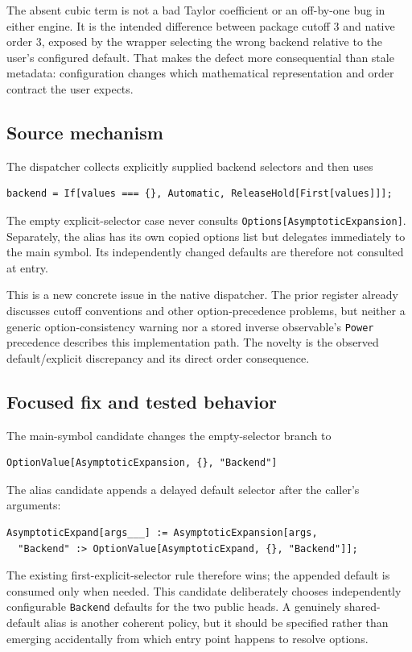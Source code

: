 \documentclass[11pt]{article}
\newcommand{\code}[1]{\texttt{#1}}
\begin{document}
The absent cubic term is not a bad Taylor coefficient or an off-by-one bug in either engine. It is the intended difference between package cutoff $3$ and native order $3$, exposed by the wrapper selecting the wrong backend relative to the user's configured default. That makes the defect more consequential than stale metadata: configuration changes which mathematical representation and order contract the user expects.

\subsection{Source mechanism}
The dispatcher collects explicitly supplied backend selectors and then uses
\begin{lstlisting}
backend = If[values === {}, Automatic, ReleaseHold[First[values]]];
\end{lstlisting}
The empty explicit-selector case never consults \code{Options[AsymptoticExpansion]}. Separately, the alias has its own copied options list but delegates immediately to the main symbol. Its independently changed defaults are therefore not consulted at entry.\cite{bridge}

This is a new concrete issue in the native dispatcher. The prior register already discusses cutoff conventions and other option-precedence problems, but neither a generic option-consistency warning nor a stored inverse observable's \code{Power} precedence describes this implementation path. The novelty is the observed default/explicit discrepancy and its direct order consequence.

\subsection{Focused fix and tested behavior}
The main-symbol candidate changes the empty-selector branch to
\begin{lstlisting}
OptionValue[AsymptoticExpansion, {}, "Backend"]
\end{lstlisting}
The alias candidate appends a delayed default selector after the caller's arguments:
\begin{lstlisting}
AsymptoticExpand[args___] := AsymptoticExpansion[args,
  "Backend" :> OptionValue[AsymptoticExpand, {}, "Backend"]];
\end{lstlisting}
The existing first-explicit-selector rule therefore wins; the appended default is consumed only when needed. This candidate deliberately chooses independently configurable \code{Backend} defaults for the two public heads. A genuinely shared-default alias is another coherent policy, but it should be specified rather than emerging accidentally from which entry point happens to resolve options.
\end{document}
